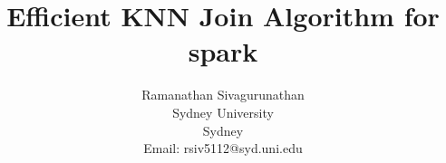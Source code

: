 \documentclass[12pt]{article}
\begin{document}
\baselineskip24pt
%
\title{Efficient KNN Join Algorithm for spark}


\author{Ramanathan Sivagurunathan \\
  Sydney University\\
    Sydney\\
    Email: rsiv5112@syd.uni.edu}


%








\maketitle
\end{document}
